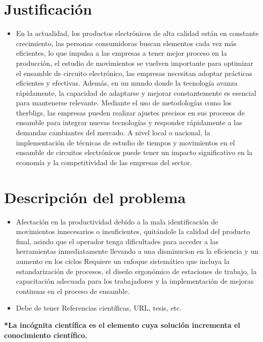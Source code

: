     \section{Justificación}
    
    \begin{itemize}
        \item En la actualidad, los productos electrónicos de alta calidad están en constante crecimiento, las personas consumidoras buscan elementos cada vez más eficientes, lo que impulsa a las empresas a tener mejor proceso en la producción, el estudio de movimientos se vuelven importante para optimizar el ensamble de circuito electrónico, las empresas necesitan adoptar prácticas eficientes y efectivas.
        Además, en un mundo donde la tecnología avanza rápidamente, la capacidad de adaptarse y mejorar constantemente es esencial para mantenerse relevante.
        Mediante el uso de metodologías como los therbligs, las empresas pueden realizar ajustes precisos en sus procesos de ensamble para integrar nuevas tecnologías y
    responder rápidamente a las demandas cambiantes del mercado.
    A nivel local o nacional, la implementación de técnicas de estudio de tiempos y movimientos en el ensamble de circuitos electrónicos puede tener un impacto significativo en la economía y la
    competitividad de las empresas del sector.
    
    \end{itemize}
    \section{Descripción del problema}
    \begin{itemize}
        \item Afectación en la productividad debido a la mala identificación de movimientos innecesarios o insuficientes, quitándole la calidad del producto final, asindo que el operador tenga dificultades para acceder a las herramientas inmediatamente llevando a una disminucion en la eficiencia y un aumento en los ciclos 
       Requiere un enfoque sistemático que incluya la estandarización de
    procesos, el diseño ergonómico de estaciones de trabajo, la capacitación adecuada para los trabajadores y la implementación de mejoras continuas en el proceso de
    ensamble.
        \item Debe de tener Referencias científicas, URL, tesis, etc.
    \end{itemize}
    
    \textbf{*La incógnita científica es el elemento cuya solución incrementa el conocimiento científico.}
